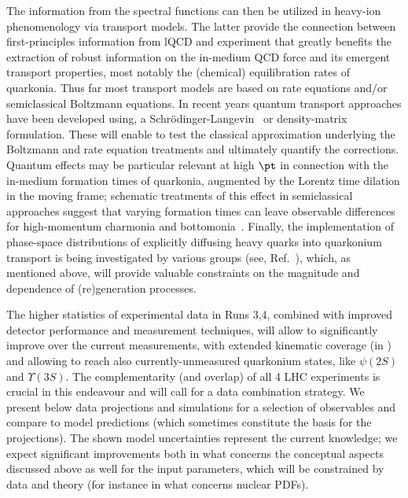 \documentclass[../report.tex]{subfiles}
\begin{document}
The information from the spectral functions can then be utilized in heavy-ion phenomenology via transport models. The latter provide the connection between first-principles information from lQCD and experiment that greatly benefits the extraction of robust information on the in-medium QCD force and its emergent transport properties, most notably the (chemical) equilibration rates of quarkonia. 
Thus far most transport models are based on rate equations and/or semiclassical Boltzmann equations. In recent years quantum transport approaches have been developed using, \eg a Schr\"odinger-Langevin~\cite{Blaizot:2015hya,Katz:2015qja,Kajimoto:2017rel} or density-matrix~\cite{Akamatsu:2014qsa,Brambilla:2016wgg} formulation. These will enable to test the classical approximation underlying the Boltzmann and rate equation treatments and ultimately quantify the corrections.  Quantum effects may be particular relevant at high $\pt$ in connection with the in-medium formation times of quarkonia, augmented by the Lorentz time dilation in the moving frame; schematic treatments of this effect in semiclassical approaches suggest that varying formation times can leave observable differences for high-momentum charmonia and bottomonia~\cite{Song:2015bja,Hoelck:2016tqf,Du:2017qkv,Aronson:2017ymv,Krouppa:2017jlg}. 
Finally, the implementation of phase-space distributions of explicitly diffusing heavy quarks into quarkonium transport is being investigated by various groups (see, \eg Ref.~\cite{Yao:2017fuc}), which, as mentioned above, will provide valuable constraints on the magnitude and \pt dependence of (re)generation processes.     


The higher statistics of experimental data in Runs 3,4, combined with improved detector performance and measurement techniques, will allow to significantly improve over the current measurements, with extended kinematic coverage (in \pT) and allowing to reach also currently-unmeasured quarkonium states, like $\psi(2S)$ and $\Upsilon(3S)$.
The complementarity (and overlap) of all 4 LHC experiments is crucial in this endeavour and will call for a data combination strategy.
We present below data projections and simulations for a selection of observables and compare to model predictions (which sometimes constitute the basis for the projections). The shown model uncertainties represent the current knowledge; we expect significant improvements both in what concerns the conceptual aspects discussed above as well for the input parameters, which will be constrained by data and theory (for instance in what concerns nuclear PDFs).
\end{document}

